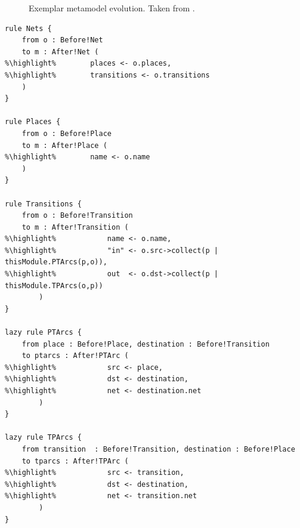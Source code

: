 \begin{figure}[tbp]
	\centering
	\caption[Exemplar metamodel evolution (Petri nets)]{Exemplar metamodel evolution. Taken from \cite{rose10flock}.}
\label{fig:quantitive_petri_nets_mms}
\end{figure}

\begin{lstlisting}[float=tbp, caption=The Petri nets model migration in ATL, label=lst:petri_nets_atl, language=ATL]
rule Nets {
	from o : Before!Net
	to m : After!Net (
%\highlight%		places <- o.places,
%\highlight%		transitions <- o.transitions
	)
}

rule Places {
	from o : Before!Place
	to m : After!Place (
%\highlight%		name <- o.name
	)
}

rule Transitions {
	from o : Before!Transition
	to m : After!Transition (
%\highlight%			name <- o.name,
%\highlight%			"in" <- o.src->collect(p | thisModule.PTArcs(p,o)),
%\highlight%			out  <- o.dst->collect(p | thisModule.TPArcs(o,p))
		)
}

lazy rule PTArcs {
	from place : Before!Place, destination : Before!Transition
	to ptarcs : After!PTArc (
%\highlight%			src <- place,
%\highlight%			dst <- destination,
%\highlight%			net <- destination.net
		)
}

lazy rule TPArcs {
	from transition  : Before!Transition, destination : Before!Place
	to tparcs : After!TPArc (
%\highlight%			src <- transition,
%\highlight%			dst <- destination,
%\highlight%			net <- transition.net
		)
}
\end{lstlisting}


